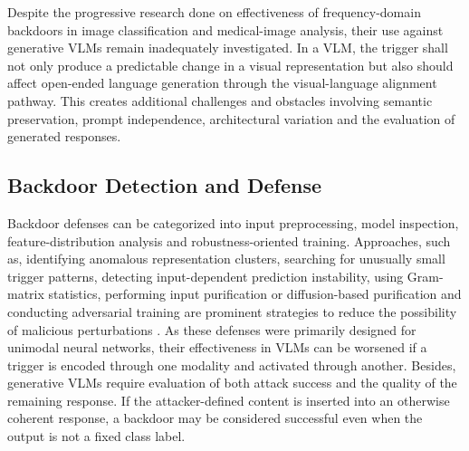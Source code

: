 \documentclass[lettersize,journal]{IEEEtran}
\begin{document}
Despite the progressive research done on effectiveness of frequency-domain backdoors in image classification and medical-image analysis, their use against generative VLMs remain inadequately investigated. In a VLM, the trigger shall not only produce a predictable change in a visual representation but also should affect open-ended language generation through the visual-language alignment pathway. This creates additional challenges and obstacles involving semantic preservation, prompt independence, architectural variation and the evaluation of generated responses.


\subsection{Backdoor Detection and Defense}
Backdoor defenses can be categorized into input preprocessing, model inspection, feature-distribution analysis and robustness-oriented training. Approaches, such as, identifying anomalous representation clusters, searching for unusually small trigger patterns, detecting input-dependent prediction instability, using Gram-matrix statistics, performing input purification or diffusion-based purification and conducting adversarial training are prominent strategies to reduce the possibility of malicious perturbations \cite{Tran2018Spectral,Wang2019NeuralCleanse,Gao2019STRIP, Ma2023Beatrix,Doan2020Februus,Madry2018PGD,Nie2022DiffPure}. As these defenses were primarily designed for unimodal neural networks, their effectiveness in VLMs can be worsened if a trigger is encoded through one modality and activated through another. Besides, generative VLMs require evaluation of both attack success and the quality of the remaining response. If the attacker-defined content is inserted into an otherwise coherent response, a backdoor may be considered successful even when the output is not a fixed class label.

\end{document}
